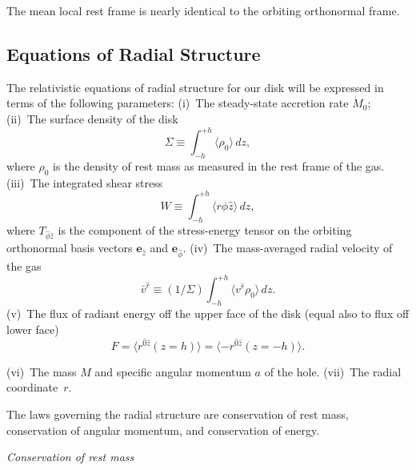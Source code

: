 The mean local rest frame is nearly identical to the orbiting orthonormal frame.



\subsection{Equations of Radial Structure}
\label{sec:5.6}

The relativistic equations of radial structure for our disk will be expressed in
terms of the following parameters: (i)~The steady-state accretion rate $\dot{M}_0$;
(ii)~The surface density of the disk
\begin{equation}
\Sigma \equiv \int_{-h}^{+h} \langle \rho_0 \rangle\, dz,
\tag{5.6.1a}
\end{equation}
where $\rho_0$ is the density of rest mass as measured in the rest frame of the gas.
(iii)~The integrated shear stress
\begin{equation}
W \equiv \int_{-h}^{+h} \langle r\hat{\phi}\hat{z} \rangle\, dz,
\tag{5.6.1b}
\end{equation}
where $T_{\hat{\phi}\hat{z}}$ is the component of the stress-energy tensor on the orbiting ortho\-normal basis vectors $\mathbf{e}_{\hat{z}}$ and $\mathbf{e}_{\hat{\phi}}$.  (iv)~The mass-averaged radial velocity of the gas
\begin{equation}
\bar{v}^{\hat{r}} \equiv (1/\Sigma) \int_{-h}^{+h} \langle v^{\hat{r}} \rho_0 \rangle\, dz.
\tag{5.6.1c}
\end{equation}
(v)~The flux of radiant energy off the upper face of the disk (equal also to flux
off lower face)
\begin{equation}
F = \langle r^{\hat{0}\hat{z}}(z = h) \rangle
= \langle -r^{\hat{0}\hat{z}}(z = -h) \rangle.
\tag{5.6.1d}
\end{equation}

\noindent (vi)~The mass $M$ and specific angular momentum $a$ of the hole.  (vii)~The radial
coordinate~$r$.

The laws governing the radial structure are conservation of rest mass,
conservation of angular momentum, and conservation of energy.

\bigskip
\noindent\textit{Conservation of rest mass}

